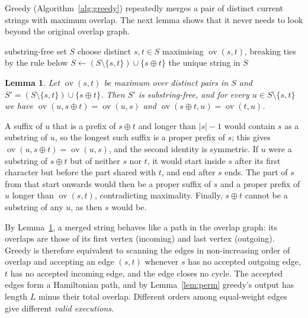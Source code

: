 \documentclass[11pt,a4paper]{article}   %
\makeatletter
\renewenvironment{proof}[1][\proofname]{\par
  \pushQED{\qed}%
  \normalfont \topsep1\p@\@plus1\p@\relax
  \trivlist
  \item[\hskip\labelsep\itshape #1\@addpunct{.}]\ignorespaces
}{\popQED\endtrivlist\@endpefalse}
\theoremstyle{compact}
\newtheorem{lemma}[theorem]{Lemma}
\theoremstyle{compactdef}
\newcommand{\ov}{\operatorname{ov}}         %
\makeatother
\begin{document}
Greedy (Algorithm~\ref{alg:greedy}) repeatedly merges a pair of distinct
current strings with maximum overlap. The next lemma shows that it never
needs to look beyond the original overlap graph.

\begin{algorithm}[h]
\caption{Maximum-overlap greedy}\label{alg:greedy}
\begin{algorithmic}[1]
\Require substring-free set $S$
  \State choose distinct $s,t\in S$ maximising $\ov(s,t)$, breaking ties by the rule below
  \State $S \gets (S\setminus\{s,t\}) \cup \{s\oplus t\}$
\EndWhile
\State \Return the unique string in $S$
\end{algorithmic}
\end{algorithm}

\begin{lemma}\label{lem:greedy-graph}
Let $\ov(s,t)$ be maximum over distinct pairs in $S$ and
$S'=(S\setminus\{s,t\})\cup\{s\oplus t\}$. Then $S'$ is substring-free, and
for every $u\in S\setminus\{s,t\}$ we have $\ov(u,s\oplus t)=\ov(u,s)$ and
$\ov(s\oplus t,u)=\ov(t,u)$.
\end{lemma}

\begin{proof}
A suffix of $u$ that is a prefix of $s\oplus t$ and longer than $|s|-1$
would contain $s$ as a substring of $u$, so the longest such suffix is a
proper prefix of $s$; this gives $\ov(u,s\oplus t)=\ov(u,s)$, and the
second identity is symmetric. If $u$ were a substring of $s\oplus t$ but
of neither $s$ nor $t$, it would start inside $s$ after its first
character but before the part shared with $t$, and end after $s$ ends. The
part of $s$ from that start onwards would then be a proper suffix of $s$
and a proper prefix of $u$ longer than $\ov(s,t)$, contradicting
maximality. Finally, $s\oplus t$ cannot be a substring of any $u$, as then
$s$ would be.
\end{proof}

By Lemma~\ref{lem:greedy-graph}, a merged string behaves like a path in
the overlap graph: its overlaps are those of its first vertex (incoming)
and last vertex (outgoing). Greedy is therefore equivalent to scanning the
edges in non-increasing order of overlap and accepting an edge $(s,t)$
whenever $s$ has no accepted outgoing edge, $t$ has no accepted incoming
edge, and the edge closes no cycle. The accepted edges form a Hamiltonian
path, and by Lemma~\ref{lem:perm} greedy's output has length $L$ minus
their total overlap. Different orders among equal-weight edges give
different \emph{valid executions}.
\end{document}
